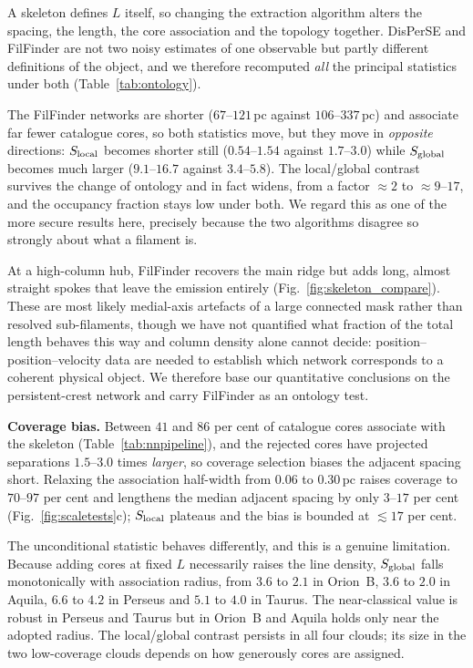 \documentclass[usenatbib,twoside,twocolumn]{mnras}
\begin{document}
A skeleton defines $L$ itself, so changing the extraction algorithm alters the spacing, the length, the core association and the topology together. DisPerSE and FilFinder are not two noisy estimates of one observable but partly different definitions of the object, and we therefore recomputed \emph{all} the principal statistics under both (Table~\ref{tab:ontology}).

The FilFinder networks are shorter ($67$--$121$\,pc against $106$--$337$\,pc) and associate far fewer catalogue cores, so both statistics move, but they move in \emph{opposite} directions: $S_{\rm local}$ becomes shorter still ($0.54$--$1.54$ against $1.7$--$3.0$) while $S_{\rm global}$ becomes much larger ($9.1$--$16.7$ against $3.4$--$5.8$). The local/global contrast survives the change of ontology and in fact widens, from a factor $\approx2$ to $\approx9$--$17$, and the occupancy fraction stays low under both. We regard this as one of the more secure results here, precisely because the two algorithms disagree so strongly about what a filament is.

At a high-column hub, FilFinder recovers the main ridge but adds long, almost straight spokes that leave the emission entirely (Fig.~\ref{fig:skeleton_compare}). These are most likely medial-axis artefacts of a large connected mask rather than resolved sub-filaments, though we have not quantified what fraction of the total length behaves this way and column density alone cannot decide: position--position--velocity data are needed to establish which network corresponds to a coherent physical object. We therefore base our quantitative conclusions on the persistent-crest network and carry FilFinder as an ontology test.

\smallskip\noindent\textbf{Coverage bias.} Between $41$ and $86$ per cent of catalogue cores associate with the skeleton (Table~\ref{tab:nnpipeline}), and the rejected cores have projected separations $1.5$--$3.0$ times \emph{larger}, so coverage selection biases the adjacent spacing short. Relaxing the association half-width from $0.06$ to $0.30$\,pc raises coverage to $70$--$97$ per cent and lengthens the median adjacent spacing by only $3$--$17$ per cent (Fig.~\ref{fig:scaletests}c); $S_{\rm local}$ plateaus and the bias is bounded at $\lesssim17$ per cent.

The unconditional statistic behaves differently, and this is a genuine limitation. Because adding cores at fixed $L$ necessarily raises the line density, $S_{\rm global}$ falls monotonically with association radius, from $3.6$ to $2.1$ in Orion~B, $3.6$ to $2.0$ in Aquila, $6.6$ to $4.2$ in Perseus and $5.1$ to $4.0$ in Taurus. The near-classical value is robust in Perseus and Taurus but in Orion~B and Aquila holds only near the adopted radius. The local/global contrast persists in all four clouds; its size in the two low-coverage clouds depends on how generously cores are assigned.
\end{document}
